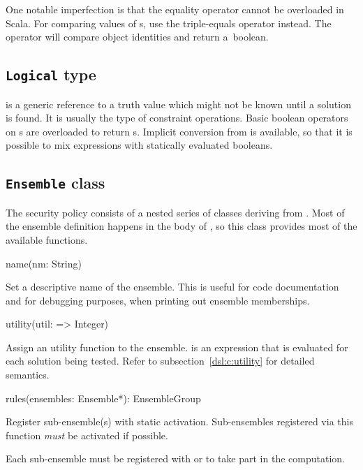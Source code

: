 One notable imperfection is that the equality operator \dop{==} cannot be overloaded in
Scala. For comparing values of s, use the triple-equals \dop{===} operator
instead. The operator \dop{==} will compare object identities and return a~boolean.


\subsection{\texttt{Logical} type}

 is a generic reference to a truth value which might not be known until a
solution is found. It is usually the type of constraint operations. Basic boolean
operators on s are overloaded to return s. Implicit conversion
from  is available, so that it is possible to mix  expressions
with statically evaluated booleans.


\subsection{\texttt{Ensemble} class}

The security policy consists of a nested series of classes deriving from .
Most of the ensemble definition happens in the body of , so this class
provides most of the available functions.

\begin{dslsig}
name(nm: String)
\end{dslsig}
\begin{dsldesc}
    Set a descriptive name of the ensemble. This is useful for code documentation and 
    for debugging purposes, when printing out ensemble memberships.
\end{dsldesc}

\begin{dslsig}
utility(util: => Integer)
\end{dslsig}
\begin{dsldesc}
    Assign an utility function to the ensemble.  is an  expression
    that is evaluated for each solution being tested. Refer to
    subsection~\ref{dsl:c:utility} for detailed semantics.
\end{dsldesc}

\begin{dslsig}
rules(ensembles: Ensemble*): EnsembleGroup
\end{dslsig}
\begin{dsldesc}
    Register sub-ensemble(s) with static activation. Sub-ensembles registered via this
    function \textit{must} be activated if possible.

    Each sub-ensemble must be registered with  or  to take part
    in the computation.
\end{dsldesc}

